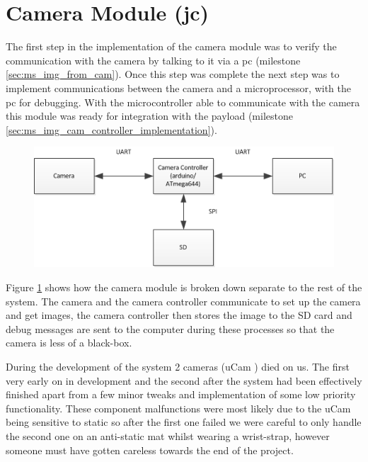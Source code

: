 
\section{Camera Module (jc)}
\label{sec:John_Implementation}

The first step in the implementation of the camera module was to verify the communication with the camera by talking to it via a pc (milestone \ref{sec:ms_img_from_cam}). Once this step was complete the next step was to implement communications between the camera and a microprocessor, with the pc for debugging. With the microcontroller able to communicate with the camera this module was ready for integration with the payload (milestone \ref{sec:ms_img_cam_controller_implementation}).

\begin{figure}[H]
        \centering
        \includegraphics[width=1.00\textwidth]{figures/CameraModuleBlock1.png}
        \label{fig:camera_block}
\end{figure}

Figure \ref{fig:camera_block} shows how the camera module is broken down separate to the rest of the system. The camera and the camera controller communicate to set up the camera and get images, the camera controller then stores the image to the SD card and debug messages are sent to the computer during these processes so that the camera is less of a black-box.

During the development of the system 2 cameras (uCam \cite{ucam_datasheet}) died on us. The first very early on in development and the second after the system had been effectively finished apart from a few minor tweaks and implementation of some low priority functionality. These component malfunctions were most likely due to the uCam being sensitive to static so after the first one failed we were careful to only handle the second one on an anti-static mat whilst wearing a wrist-strap, however someone must have gotten careless towards the end of the project.


